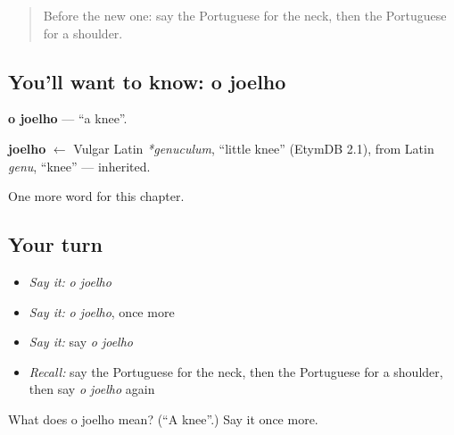 \label{lesson:PT-C31-joelho}



\begin{quote}
Before the new one: say the Portuguese for the neck, then the Portuguese for a shoulder.
\end{quote}

\subsection*{You'll want to know: o joelho}
\textbf{o joelho} — \textquotedblleft{}a knee\textquotedblright{}.

\begin{cousinweb}
\textbf{joelho} $\leftarrow$ Vulgar Latin \emph{*genuculum}, \textquotedblleft{}little knee\textquotedblright{} (EtymDB 2.1), from Latin \emph{genu}, \textquotedblleft{}knee\textquotedblright{} — inherited.
\end{cousinweb}

\begin{grammarlens}[title={What you've built}]
One more word for this chapter.
\end{grammarlens}

\subsection*{Your turn}
\begin{itemize}
\raggedright
  \item \emph{Say it:} \emph{o joelho}
  \item \emph{Say it:} \emph{o joelho}, once more
  \item \emph{Say it:} say \emph{o joelho}
  \item \emph{Recall:} say the Portuguese for the neck, then the Portuguese for a shoulder, then say \emph{o joelho} again
\end{itemize}

\begin{tcolorbox}[breakable,colback=teal!4,colframe=teal!35!black,title={Before you move on}]
What does o joelho mean? (\textquotedblleft{}A knee\textquotedblright{}.) Say it once more.
\end{tcolorbox}
